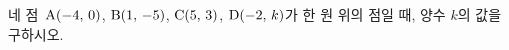 네 점~$\mathrm{A}(-4,\mkern3mu 0)$, $\mathrm{B}(1,\mkern3mu -5)$, $\mathrm{C}(5,\mkern3mu 3)$, $\mathrm{D}(-2,\mkern3mu k)$가 한 원 위의 점일 때, 양수 $k$의 값을 구하시오.
